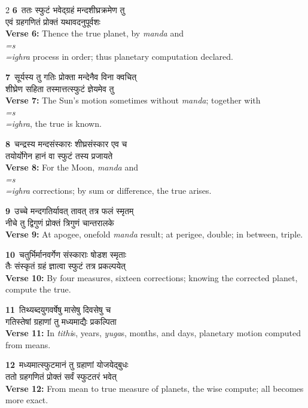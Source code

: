 \documentclass[11pt,a4paper]{article}
\newcommand{\dev}[1]{{\devanagarifont #1}}
\newcommand{\iast}[1]{\textit{#1}}
\newcommand{\vnum}[1]{\textcolor{versenumbercolor}{\textbf{#1}}}
\begin{document}
\begin{paracol}{2}
\switchcolumn[0]
\vnum{6}\ \dev{ततः स्फुटं भवेद्ग्रहं मन्दशीघ्रक्रमेण तु}\\
\dev{एवं ग्रहगणितं प्रोक्तं यथावदनुपूर्वशः}\\
\switchcolumn[1]
\textbf{Verse 6:} Thence the true planet, by \iast{manda} and \iast{\\=s\\=ighra} process in order; thus planetary computation declared.

\switchcolumn[0]
\vnum{7}\ \dev{सूर्यस्य तु गतिः प्रोक्ता मन्देनैव विना क्वचित्}\\
\dev{शीघ्रेण सहिता तस्मात्तत्स्फुटं ज्ञेयमेव तु}\\
\switchcolumn[1]
\textbf{Verse 7:} The Sun's motion sometimes without \iast{manda}; together with \iast{\\=s\\=ighra}, the true is known.

\switchcolumn[0]
\vnum{8}\ \dev{चन्द्रस्य मन्दसंस्कारः शीघ्रसंस्कार एव च}\\
\dev{तयोर्योगेन हानं वा स्फुटं तस्य प्रजायते}\\
\switchcolumn[1]
\textbf{Verse 8:} For the Moon, \iast{manda} and \iast{\\=s\\=ighra} corrections; by sum or difference, the true arises.

\switchcolumn[0]
\vnum{9}\ \dev{उच्चे मन्दगतिर्यावत् तावत् तत्र फलं स्मृतम्}\\
\dev{नीचे तु द्विगुणं प्रोक्तं त्रिगुणं चान्तरालके}\\
\switchcolumn[1]
\textbf{Verse 9:} At apogee, onefold \iast{manda} result; at perigee, double; in between, triple.

\switchcolumn[0]
\vnum{10}\ \dev{चतुर्भिर्मानवर्गेण संस्काराः षोडश स्मृताः}\\
\dev{तैः संस्कृतं ग्रहं ज्ञात्वा स्फुटं तत्र प्रकल्पयेत्}\\
\switchcolumn[1]
\textbf{Verse 10:} By four measures, sixteen corrections; knowing the corrected planet, compute the true.

\switchcolumn[0]
\vnum{11}\ \dev{तिथ्यब्दयुगवर्षेषु मासेषु दिवसेषु च}\\
\dev{गतिस्तेषां ग्रहाणां तु मध्यमाद्यैः प्रकल्पिता}\\
\switchcolumn[1]
\textbf{Verse 11:} In \iast{tithi}s, years, \iast{yuga}s, months, and days, planetary motion computed from means.

\switchcolumn[0]
\vnum{12}\ \dev{मध्यमात्स्फुटमानं तु ग्रहाणां योजयेद्बुधः}\\
\dev{ततो ग्रहगणितं प्रोक्तं सर्वं स्फुटतरं भवेत्}\\
\switchcolumn[1]
\textbf{Verse 12:} From mean to true measure of planets, the wise compute; all becomes more exact.


\end{paracol}
\end{document}
